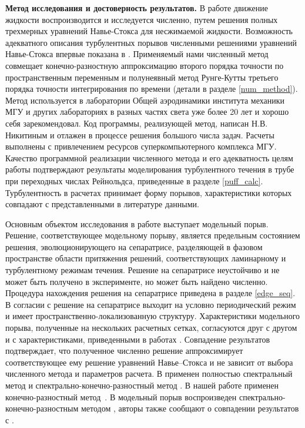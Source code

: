 {\bf Метод исследования и достоверность результатов.}
В работе движение жидкости воспроизводится и исследуется численно, путем решения полных трехмерных уравнений Навье-Стокса для несжимаемой жидкости. Возможность адекватного описания турбулентных порывов численными решениями уравнений Навье-Стокса впервые показана в \cite{Priymak2004}. Применяемый нами численный метод совмещает конечно-разностную аппроксимацию второго порядка точности по пространственным переменным и полунеявный метод Рунге-Кутты третьего порядка точности интегрирования по времени \cite{Nikitin2006, Nikitin2006third} (детали в разделе \ref{num_method}). Метод используется в лаборатории Общей аэродинамики института механики МГУ и других лабораториях в разных частях света уже более 20 лет и хорошо себя зарекомендовал. Код программы, реализующей метод, написан Н.В.\,Никитиным и отлажен в процессе решения большого числа задач. Расчеты выполнены с привлечением ресурсов суперкомпьютерного комплекса МГУ. Качество программной реализации численного метода и его адекватность целям работы подтверждают результаты моделирования турбулентного течения в трубе при переходных числах Рейнольдса, приведенные в разделе \ref{puff_calc}. Турбулентность в расчетах принимает форму порывов, характеристики которых совпадают с представленными в литературе данными. 

Основным объектом исследования в работе выступает модельный порыв. Решение, соответствующее модельному порыву, является предельным состоянием решения, эволюционирующего на сепаратрисе, разделяющей в фазовом пространстве области притяжения решений, соответствующих ламинарному и турбулентному режимам течения. Решение на сепаратрисе неустойчиво и не может быть получено в эксперименте, но может быть найдено численно. Процедура нахождения решения на сепаратрисе приведена в разделе \ref{edge_seq}. В согласии с \cite{Avila2013} решение на сепаратрисе выходит на условно периодический режим и имеет пространственно-локализованную структуру. Характеристики модельного порыва, полученные на нескольких расчетных сетках, согласуются друг с другом и с характеристиками, приведенными в работах \cite{Avila2013, Chantry2014}. Совпадение результатов подтверждает, что полученное численно решение аппроксимирует соответствующее ему решение уравнений Навье--Стокса и не зависит от выбора численного метода и параметров расчета. В \cite{Avila2013} применен полностью спектральный метод \cite{Meseguer2007} и спектрально-конечно-разностный метод \cite{Willis2009}. В нашей работе применен конечно-разностный метод~\cite{Nikitin2006}. В \cite{Chantry2014} модельный порыв воспроизведен спектрально-конечно-разностным методом \cite{Willis2009}, авторы также сообщают о совпадении результатов с \cite{Avila2013}. 

